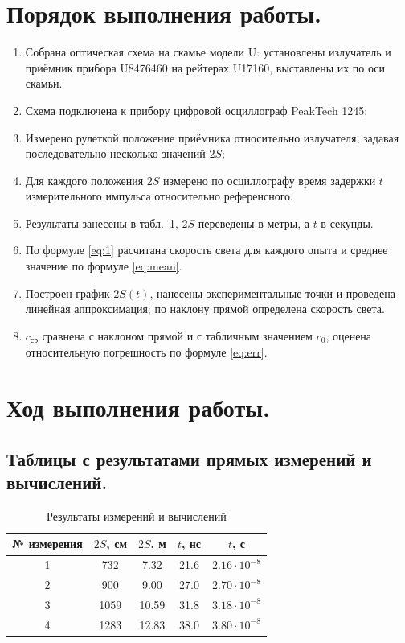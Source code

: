 \documentclass[12pt, a4paper]{article}
\begin{document}
	\section{Порядок выполнения работы.}
	\begin{enumerate}
		\item Собрана оптическая схема на скамье модели U: установлены излучатель и приёмник прибора U8476460 на рейтерах U17160, выставлены их по оси скамьи.
		\item Схема подключена к прибору цифровой осциллограф PeakTech 1245;
		\item Измерено рулеткой положение приёмника относительно излучателя, задавая последовательно несколько значений $2S$;
		\item Для каждого положения $2S$ измерено по осциллографу время задержки $t$ измерительного импульса относительно референсного.
		\item Результаты занесены в табл.~\ref{tab:data}, $2S$ переведены в метры, а $t$ в секунды.
		\item По формуле \eqref{eq:1} расчитана скорость света для каждого опыта и среднее значение по формуле \eqref{eq:mean}.
		\item Построен график $2S(t)$, нанесены экспериментальные точки и проведена линейная аппроксимация; по наклону прямой определена скорость света.
		\item $c_{\text{ср}}$ сравнена с наклоном прямой и с табличным значением $c_0$, оценена относительную погрешность по формуле \eqref{eq:err}.
	\end{enumerate}
	
	\section{Ход выполнения работы.}
	
	\subsection{Таблицы с результатами прямых измерений и вычислений.}
	\begin{table}[H]
		\caption{Результаты измерений и вычислений}
		\label{tab:data}
		\centering
		\begin{tabular}{|c|c|c|c|c|}
			\hline
			№ измерения & \(2S\), см & \(2S\), м & \(t\), нс & \(t\), с \\
			\hline
			1 & 732 & 7.32 & 21.6 & \(2.16 \cdot 10^{-8}\) \\
			2 & 900 & 9.00 & 27.0 & \(2.70 \cdot 10^{-8}\) \\
			3 & 1059 & 10.59 & 31.8 & \(3.18 \cdot 10^{-8}\) \\
			4 & 1283 & 12.83 & 38.0 & \(3.80 \cdot 10^{-8}\) \\
			\hline
		\end{tabular}
	\end{table}
	
\end{document}
